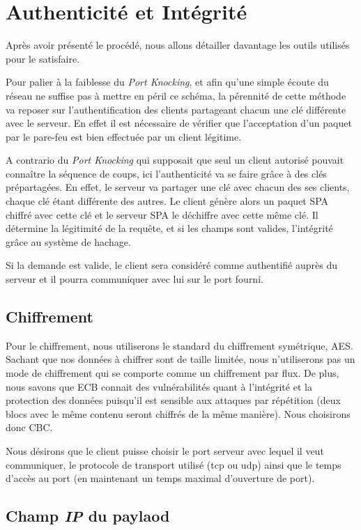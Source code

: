 \chapter{Authenticité et Intégrité}
Après avoir présenté le procédé, nous allons détailler davantage les outils utilisés pour le satisfaire.

Pour palier à la faiblesse du \emph{Port Knocking}, et afin qu'une simple écoute du réseau ne suffise pas à mettre en péril ce schéma, la pérennité de cette méthode va reposer sur l'authentification des clients partageant chacun une clé différente avec le serveur. En effet il est nécessaire de vérifier que l'acceptation d'un paquet par le pare-feu est bien effectuée par un client légitime.

A contrario du \emph{Port Knocking} qui supposait que seul un client autorisé pouvait connaître la séquence de coups, ici l'authenticité va se faire grâce à des clés prépartagées. En effet, le serveur va partager une clé avec chacun des ses clients, chaque clé étant différente des autres. 
Le client génère alors un paquet SPA chiffré avec cette clé et le serveur SPA le déchiffre avec cette même clé. Il détermine la légitimité de la requête, et si les champs sont valides, l'intégrité grâce au système de hachage.

Si la demande est valide, le client sera considéré comme authentifié auprès du serveur et il pourra communiquer avec lui sur le port fourni.

\section{Chiffrement}

Pour le chiffrement, nous utiliserons le standard du chiffrement symétrique, AES. 
Sachant que nos données à chiffrer sont de taille limitée, nous n'utiliserons pas un mode de chiffrement qui se comporte comme un chiffrement par flux.
De plus, nous savons que ECB connait des vulnérabilités quant à l'intégrité et la protection des données puisqu'il est sensible aux attaques par répétition (deux blocs avec le même contenu seront chiffrés de la même manière).
Nous choisirons donc CBC.

Nous désirons que le client puisse choisir le port serveur avec lequel il veut communiquer, le protocole de transport utilisé (tcp ou udp) ainsi que le temps d'accès au port (en maintenant un temps maximal d'ouverture de port).

\section{Champ \textbf{\emph{IP}} du paylaod}

